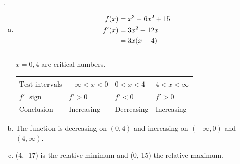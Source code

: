 \documentclass[11pt]{article}
\newcommand*{\vs}{\vspace{1cm}}
\newcommand*{\next}{\noindent}
\newcommand*{\set}{\setcounter{equation}{0}}
\begin{document}
\vs
\next
22.\begin{enumerate}[(a)]
    \item \begin{align}
        \set
        f(x)&=x^3-6x^2+15\\
        f'(x)&=3x^2-12x\\
        &=3x(x-4)
    \end{align}\\
    $x=0, 4$ are critical numbers.
    \newpage
    \begin{flushleft}
        \begin{table}
                \begin{tabular}{|l|l|l|l|} %
                    \hline
                    $\text{Test intervals}$ & $-\infty<x<0$ & $0<x<4$ & $4<x<\infty$\\ \hline
                    $f'\,\,\,\,\text{sign}$ & $f'>0$ & $f'<0$ & $f'>0$\\ \hline
                    $\text{Conclusion}$ & Increasing & Decreasing & Increasing\\
                    \hline
             \end{tabular}
            \end{table}
        \end{flushleft}
        \item The function is decreasing on $(0, 4)$ and increasing on $(-\infty, 0)$ and $(4, \infty)$.\\
        \item (4, -17) is the relative minimum and (0, 15) the relative maximum.
\end{enumerate}
\end{document}
